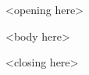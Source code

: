 \documentclass{letter}
\begin{document}
\begin{letter}{}
  \opening{<opening here>}

  <body here>
  
  \closing{<closing here>}

\end{letter}
\end{document}
